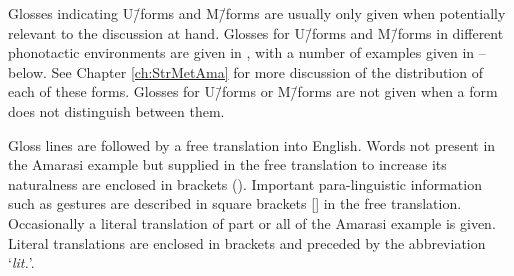 Glosses indicating U\=/forms and M\=/forms
are usually only given when potentially relevant to the discussion at hand.
Glosses for U\=/forms and M\=/forms in different phonotactic environments are given in ,
with a number of examples given in -- below.
See Chapter \ref{ch:StrMetAma} for more discussion of the distribution
of each of these forms.
Glosses for U\=/forms or M\=/forms are not given when a form
does not distinguish between them.

\begin{exe}
	\label{ex:120715-4, 0.05 ch:Int}
	\label{130825-6, 10.05 ch:Int}
	\label{120923-1, 6.01}
	\label{130821-1, 6.20}
\end{exe}

Gloss lines are followed by a free translation into English.
Words not present in the Amarasi example
but supplied in the free translation to increase
its naturalness are enclosed in brackets ().
Important para-linguistic information such as gestures
are described in square brackets [] in the free translation.
Occasionally a literal translation of part or all of the Amarasi example is given.
Literal translations are enclosed in brackets and preceded by the abbreviation `\emph{lit.}'.

